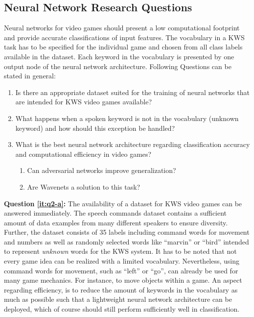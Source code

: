 \subsection{Neural Network Research Questions}\label{sec:intro_rq_nn}
Neural networks for video games should present a low computational footprint and provide accurate classifications of input features.
The vocabulary in a KWS task has to be specified for the individual game and chosen from all class labels available in the dataset.
Each keyword in the vocabulary is presented by one output node of the neural network architecture.
Following Questions can be stated in general:
\begin{enumerate}[label={Q.2.\alph*)}, leftmargin=1.75cm]
  \item Is there an appropriate dataset suited for the training of neural networks that are intended for KWS video games available?\label{it:q2-a}
  \item What happens when a spoken keyword is not in the vocabulary (unknown keyword) and how should this exception be handled?\label{it:q2-b}
  \item What is the best neural network architecture regarding classification accuracy and computational efficiency in video games?\label{it:q2-c}
  \begin{enumerate}[label=(\roman*)]
    \item Can adversarial networks improve generalization?
    \item Are Wavenets a solution to this task?
  \end{enumerate}
\end{enumerate}
\noindent
\textbf{Question \ref{it:q2-a}:} 
The availability of a dataset for KWS video games can be answered immediately. 
The speech commands dataset \cite{Warden2018} contains a sufficient amount of data examples from many different speakers to ensure diversity.
Further, the dataset consists of 35 labels including command words for movement and numbers as well as randomly selected words like \enquote{marvin} or \enquote{bird} intended to represent \emph{unknown} words for the KWS system.
It has to be noted that not every game idea can be realized with a limited vocabulary.
Nevertheless, using command words for movement, such as \enquote{left} or \enquote{go}, can already be used for many game mechanics.
For instance, to move objects within a game.
An aspect regarding efficiency, is to reduce the amount of keywords in the vocabulary as much as possible such that a lightweight neural network architecture can be deployed, which of course should still perform sufficiently well in classification.

